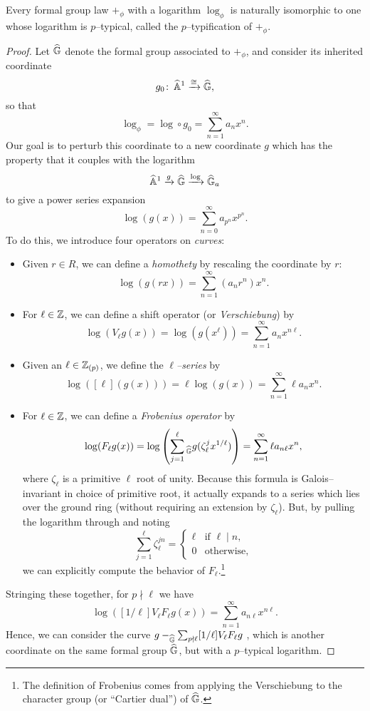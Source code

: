 \begin{lemma}\label{EveryLogHaspTypification}
Every formal group law $+_\phi$ with a logarithm $\log_\phi$ is naturally isomorphic to one whose logarithm is $p$--typical, called the $p$--typification of $+_\phi$.
\end{lemma}
\begin{proof}
Let $\widehat{\mathbb G}$ denote the formal group associated to $+_\phi$, and consider its inherited coordinate \[g_0\colon\thinspace \widehat{\mathbb{A}}^1 \xrightarrow{\cong} \widehat{\mathbb G},\] so that \[\log_\phi = \log \circ g_0 = \sum_{n=1}^\infty a_n x^n.\]  Our goal is to perturb this coordinate to a new coordinate $g$ which has the property that it couples with the logarithm \[\widehat{\mathbb{A}}^1 \xrightarrow{g} \widehat{\mathbb G} \xrightarrow{\log} \widehat{\mathbb G}_a\] to give a power series expansion \[\log(g(x)) = \sum_{n=0}^\infty a_{p^n} x^{p^n}.\]  To do this, we introduce four operators on \emph{curves}:
\begin{itemize}
\item Given $r \in R$, we can define a \textit{homothety} by rescaling the coordinate by $r$: \[\log(g(rx)) = \sum_{n=1}^\infty (a_n r^n) x^n.\]
\item For $\ell \in \mathbb Z$, we can define a shift operator (or \textit{Verschiebung}) by \[\log(V_\ell g(x)) = \log(g(x^\ell)) = \sum_{n=1}^\infty a_n x^{n \ell}.\]
\item Given an $\ell \in \mathbb Z_{(p)}$, we define the \textit{$\ell$--series} by \[\log([\ell](g(x))) = \ell \log(g(x)) = \sum_{n=1}^\infty \ell a_n x^n.\]
\item For $\ell \in \mathbb Z$, we can define a \textit{Frobenius operator} by \[\log(F_\ell g(x)) = \log\left(\sum_{j=1}^\ell{}_{\widehat{\mathbb G}} g(\zeta_\ell^j x^{1/\ell}) \right) = \sum_{n=1}^\infty \ell a_{n \ell} x^n,\] where $\zeta_\ell$ is a primitive $\ell${\th} root of unity.  Because this formula is Galois--invariant in choice of primitive root, it actually expands to a series which lies over the ground ring (without requiring an extension by $\zeta_\ell$).  But, by pulling the logarithm through and noting \[\sum_{j=1}^\ell \zeta_\ell^{jn} = \begin{cases}\ell & \text{if $\ell \mid n$}, \\ 0 & \text{otherwise}, \end{cases}\] we can explicitly compute the behavior of $F_\ell$.\footnote{The definition of Frobenius comes from applying the Verschiebung to the character group (or ``Cartier dual'') of $\widehat{\mathbb G}$.}
\end{itemize}
Stringing these together, for $p \nmid \ell$ we have \[\log([1/\ell] V_\ell F_\ell g(x)) = \sum_{n=1}^\infty a_{n \ell} x^{n \ell}.\]  Hence, we can consider the curve $g -_{\widehat{\mathbb G}} \sum_{p \nmid \ell} [1/\ell] V_\ell F_\ell g$ , which is another coordinate on the same formal group $\widehat{\mathbb G}$, but with a $p$--typical logarithm.
\end{proof}

